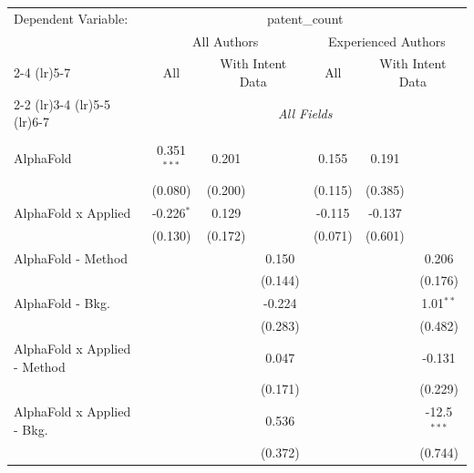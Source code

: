 \begingroup
\centering
\begin{tabular}{lcccccc}
   \tabularnewline \midrule \midrule
   Dependent Variable: & \multicolumn{6}{c}{patent\_count}\\
 & \multicolumn{3}{c}{All Authors} & \multicolumn{3}{c}{Experienced Authors} \\
\cmidrule(lr){2-4} \cmidrule(lr){5-7}
 & \multicolumn{1}{c}{All} & \multicolumn{2}{c}{With Intent Data} & \multicolumn{1}{c}{All} & \multicolumn{2}{c}{With Intent Data} \\
\cmidrule(lr){2-2} \cmidrule(lr){3-4} \cmidrule(lr){5-5} \cmidrule(lr){6-7}
 & \multicolumn{6}{c}{\textit{All Fields}} \\ \\
   AlphaFold                      & 0.351$^{***}$ & 0.201   &               & 0.155       & 0.191   &   \\   
                                  & (0.080)       & (0.200) &               & (0.115)     & (0.385) &   \\   
   AlphaFold x Applied            & -0.226$^{*}$  & 0.129   &               & -0.115      & -0.137  &   \\   
                                  & (0.130)       & (0.172) &               & (0.071)     & (0.601) &   \\   
   AlphaFold - Method             &               &         & 0.150         &             &         & 0.206\\   
                                  &               &         & (0.144)       &             &         & (0.176)\\   
   AlphaFold - Bkg.               &               &         & -0.224        &             &         & 1.01$^{**}$\\   
                                  &               &         & (0.283)       &             &         & (0.482)\\   
   AlphaFold x Applied - Method   &               &         & 0.047         &             &         & -0.131\\   
                                  &               &         & (0.171)       &             &         & (0.229)\\   
   AlphaFold x Applied - Bkg.     &               &         & 0.536         &             &         & -12.5$^{***}$\\   
                                  &               &         & (0.372)       &             &         & (0.744)\\   

\end{tabular}
